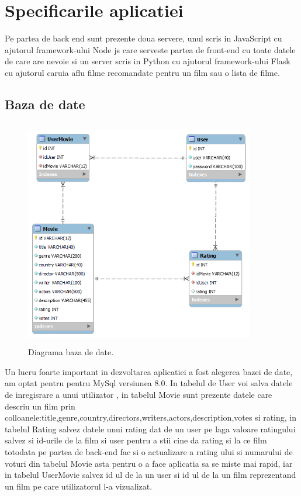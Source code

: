 \chapter{ Specificarile aplicatiei}
\label{chap:ch5}

\par Pe partea de back end sunt prezente doua servere, unul scris in JavaScript cu ajutorul framework-ului Node js care serveste partea de front-end cu toate datele de care are nevoie si un server scris in Python cu ajutorul framework-ului Flask cu ajutorul caruia aflu filme recomandate pentru un film sau o lista  de filme.

\section{Baza de date}
\label{sec:ch5sec1}

\begin{figure}[htbp]
\centerline{\includegraphics[width=10cm, height=10cm]{figures/diagrama db.png}}
\caption{Diagrama baza de date.}
\label{fig}
\end{figure}

\par Un lucru foarte important in dezvoltarea aplicatiei a fost alegerea bazei de date, am optat pentru pentru MySql versiunea 8.0. In tabelul de User voi salva datele de inregisrare a unui utilizator , in tabelul  Movie sunt prezente datele care descriu un film prin colloanele:title,genre,country,directors,writers,actors,description,votes si rating, in tabelul Rating salvez datele unui rating dat de un user pe laga valoare ratingului salvez si id-urile de la film si user pentru a stii cine da rating si la ce film totodata pe partea de back-end fac si o actualizare a rating ului si numarului de voturi din tabelul Movie asta pentru o a face aplicatia sa se miste mai rapid, iar in tabelul UserMovie salvez id ul de la un user si id ul de la un film reprezentand un film pe care utilizatorul l-a vizualizat.

